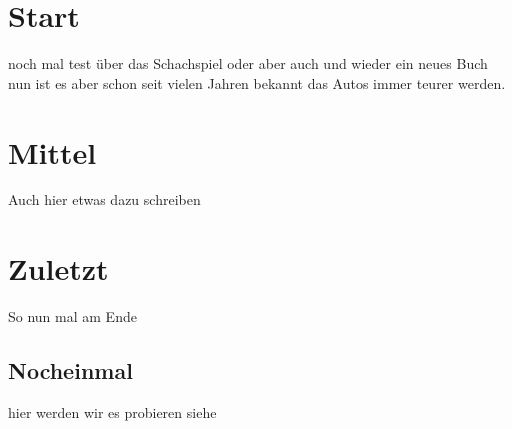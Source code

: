 \documentclass[11pt,a4paper,parskip]{scrartcl}
\begin{document}
\section{Start}
noch mal test über das Schachspiel \autocite{Schach} oder aber auch \autocite{HIT} und wieder \label{sec:test} ein neues Buch \autocite{hyp}nun ist es aber schon seit vielen Jahren bekannt das Autos immer teurer werden.
\section{Mittel}
Auch hier etwas dazu schreiben 
\newpage
\section{Zuletzt}
So nun mal am Ende
\subsection{Nocheinmal}
hier werden wir es probieren siehe 
\printbibliography 
\end{document}
